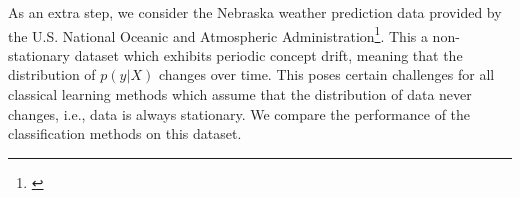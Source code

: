 As an extra step, we consider the Nebraska weather prediction data provided by the U.S. National Oceanic and Atmospheric Administration\footnote{\url{}}. This a non-stationary dataset which exhibits periodic concept drift, meaning that the distribution of \(p(y|X)\) changes over time. This poses certain challenges for all classical learning methods which assume that the distribution of data never changes, i.e., data is always stationary. We compare the performance of the classification methods on this dataset.